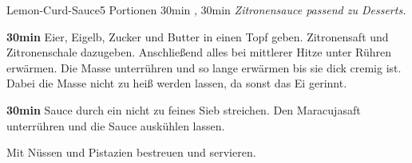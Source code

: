 \documentclass[../recipe-collections/cooking.tex]{subfiles}
\begin{document}
\begin{recipe}{Lemon-Curd-Sauce}{5 Portionen }{30min , 30min }
  \freeform{}\textit{Zitronensauce passend zu Desserts.}


  \textbf{30min}
  Eier, Eigelb, Zucker und Butter in einen Topf geben.
  Zitronensaft und Zitronenschale dazugeben.
  Anschließend alles bei mittlerer Hitze unter Rühren erwärmen.
  Die Masse unterrühren und so lange erwärmen bis sie dick cremig ist.
  Dabei die Masse nicht zu heiß werden lassen, da sonst das Ei gerinnt.


  \textbf{30min}
  Sauce durch ein nicht zu feines Sieb streichen.
  Den Maracujasaft unterrühren und die Sauce auskühlen lassen.


  Mit Nüssen und Pistazien bestreuen und servieren.

  \freeform{}\hrulefill{}

\end{recipe}
\end{document}
